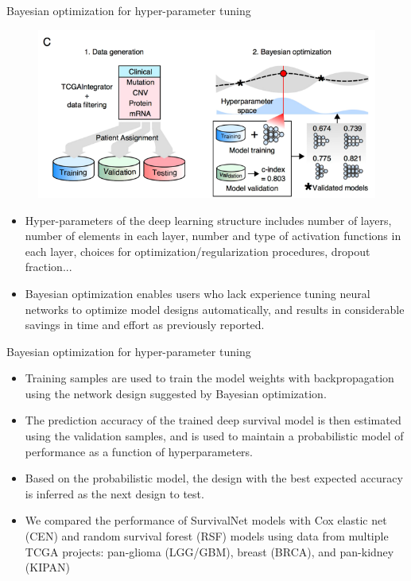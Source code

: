 \documentclass[
]{beamer}
\begin{document}
	\begin{frame}[plain]{Bayesian optimization for hyper-parameter tuning}
		\begin{figure}
			\includegraphics[scale=0.3]{bayes1}
		\end{figure}
		\begin{itemize}
			\item Hyper-parameters of the deep learning structure includes number of layers, number
			of elements in each layer,  number and type of activation functions in each layer,  choices for optimization/regularization procedures,  dropout fraction...
			\item Bayesian optimization enables users
			who lack experience tuning neural networks to optimize model designs automatically, and results in considerable
			savings in time and effort as previously reported.
		\end{itemize}
	\end{frame}
	
	\begin{frame}{Bayesian optimization for hyper-parameter tuning}
		\begin{itemize}
			\item Training samples are used to train the model weights with backpropagation using the network
			design suggested by Bayesian optimization.
			\item The prediction accuracy of the trained deep survival model is then
			estimated using the validation samples, and is used to maintain a probabilistic model of performance as a function
			of hyperparameters.
			\item  Based on the probabilistic model, the design with the best expected accuracy is inferred
			as the next design to test.
			\item We compared
			the performance of SurvivalNet models with Cox elastic net (CEN) and random survival forest (RSF) models
			using data from multiple TCGA projects: pan-glioma (LGG/GBM), breast (BRCA), and pan-kidney (KIPAN)
		\end{itemize}
	\end{frame}
	
\end{document}
